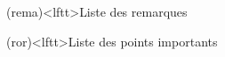 \documentclass[../../main/main.tex]{subfiles}
\begin{document}
\begin{boxes}
	\begin{tcb}(rema)<lftt>{Liste des remarques}
	\end{tcb}
	\begin{tcb}(ror)<lftt>{Liste des points importants}
	\end{tcb}
\end{boxes}
\vspace*{\fill}
\newpage
\end{document}
